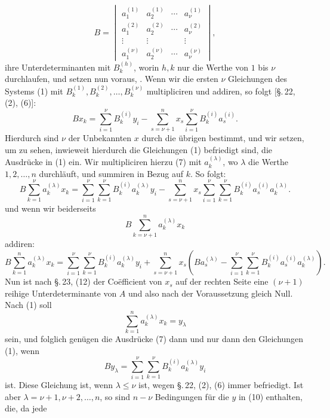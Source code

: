 
\begin{equation}
 B=\begin{vmatrix}
 a_1^{(1)}&a_2^{(1)}&\cdots&a_\nu^{(1)}\\
 a_1^{(2)}&a_2^{(2)}&\cdots&a_\nu^{(2)}\\
 \vdots&\vdots&&\vdots\\
 a_1^{(\nu)}&a_2^{(\nu)}&\cdots&a_\nu^{(\nu)}
 \end{vmatrix},
\tag{6}
\end{equation}
ihre Unterdeterminanten mit $B_k^{(h)}$, worin $h,k$ nur die Werthe von $1$ bis $\nu$ durchlaufen, und setzen nun voraus, . Wenn wir die ersten $\nu$ Gleichungen des Systems (1) mit $B_k^{(1)},B_k^{(2)},\ldots,B_k^{(\nu)}$ multipliciren und addiren, so folgt [\S.\,22, (2), (6)]:
\begin{equation}
 Bx_k=\sum_{i=1}^{\nu}B_k^{(i)}y_i-
 \sum_{s=\nu+1}^{n}x_s\sum_{i=1}^{\nu}B_k^{(i)}a_s^{(i)}.
\tag{7}
\end{equation}
Hierdurch sind $\nu$ der Unbekannten $x$ durch die übrigen bestimmt, und wir setzen, um zu sehen, inwieweit hierdurch die Gleichungen (1) befriedigt sind, die Ausdrücke in (1) ein. Wir multipliciren hierzu (7) mit $a_k^{(\lambda)}$, wo $\lambda$ die Werthe $1,2,\ldots,n$ durchläuft, und summiren in Bezug auf $k$. So folgt:
\begin{equation}
 B\sum_{k=1}^{\nu}a_k^{(\lambda)}x_k
 =\sum_{i=1}^{\nu}\sum_{k=1}^{\nu}B_k^{(i)}a_k^{(\lambda)}y_i
 -\sum_{s=\nu+1}^{n}x_s\sum_{i=1}^{\nu}\sum_{k=1}^{\nu}B_k^{(i)}a_s^{(i)}a_k^{(\lambda)}.
\tag{8}
\end{equation}
und wenn wir beiderseits
\[
 B\sum_{k=\nu+1}^{n}a_k^{(\lambda)}x_k
\]
addiren:
\begin{equation}
 B\sum_{k=1}^{n}a_k^{(\lambda)}x_k
 =\sum_{i=1}^{\nu}\sum_{k=1}^{\nu}B_k^{(i)}a_k^{(\lambda)}y_i
 +\sum_{s=\nu+1}^{n}x_s\left(Ba_s^{(\lambda)}-
 \sum_{i=1}^{\nu}\sum_{k=1}^{\nu}B_k^{(i)}a_s^{(i)}a_k^{(\lambda)}\right).
\tag{9}
\end{equation}
Nun ist nach \S.\,23, (12) der Coëfficient von $x_s$ auf der rechten Seite eine $(\nu+1)$reihige Unterdeterminante von $A$ und also nach der Voraussetzung gleich Null. Nach (1) soll
\[
 \sum_{k=1}^{n}a_k^{(\lambda)}x_k=y_\lambda
\]
sein, und folglich genügen die Ausdrücke (7) dann und nur dann den Gleichungen (1), wenn
\begin{equation}
 B y_\lambda=\sum_{i=1}^{\nu}\sum_{k=1}^{\nu}B_k^{(i)}a_k^{(\lambda)}y_i
\tag{10}
\end{equation}
ist. Diese Gleichung ist, wenn $\lambda\le\nu$ ist, wegen \S.\,22, (2), (6) immer befriedigt. Ist aber $\lambda=\nu+1,\nu+2,\ldots,n$, so sind $n-\nu$ Bedingungen für die $y$ in (10) enthalten, die, da jede
